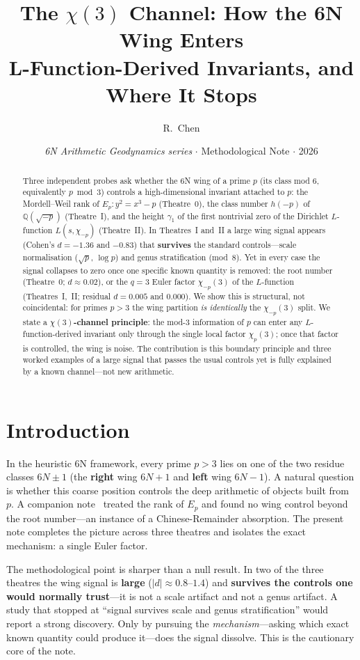 \documentclass[11pt]{article}
\title{\textbf{The $\chi(3)$ Channel: How the 6N Wing Enters\\
L-Function-Derived Invariants, and Where It Stops}}
\author{R.\ Chen}
\affil{GUT Geoservice Inc., Montr\'eal}
\date{\textit{6N Arithmetic Geodynamics series} $\cdot$ Methodological Note $\cdot$ 2026}
\newcommand{\chip}{\chi_{-p}}
\begin{document}
\maketitle

\begin{abstract}
\noindent
Three independent probes ask whether the 6N wing of a prime $p$ (its class mod $6$, equivalently
$p \bmod 3$) controls a high-dimensional invariant attached to $p$: the Mordell--Weil rank of
$E_p : y^2 = x^3 - p$ (Theatre~0), the class number $h(-p)$ of $\mathbb{Q}(\sqrt{-p})$ (Theatre~I),
and the height $\gamma_1$ of the first nontrivial zero of the Dirichlet $L$-function $L(s,\chip)$
(Theatre~II). In Theatres~I and~II a large wing signal appears (Cohen's $d = -1.36$ and $-0.83$)
that \textbf{survives} the standard controls---scale normalisation ($\sqrt{p}$, $\log p$) and genus
stratification (mod~8). Yet in every case the signal collapses to zero once one specific known
quantity is removed: the root number (Theatre~0; $d \approx 0.02$), or the $q=3$ Euler factor
$\chip(3)$ of the $L$-function (Theatres~I,~II; residual $d = 0.005$ and $0.000$). We show this is
structural, not coincidental: for primes $p > 3$ the wing partition \emph{is identically} the
$\chip(3)$ split. We state a \textbf{$\chi(3)$-channel principle}: the mod-3 information of $p$ can
enter any $L$-function-derived invariant only through the single local factor $\chi_p(3)$; once that
factor is controlled, the wing is noise. The contribution is this boundary principle and three worked
examples of a large signal that passes the usual controls yet is fully explained by a known
channel---not new arithmetic.
\end{abstract}

\section{Introduction}
In the heuristic 6N framework, every prime $p>3$ lies on one of the two residue classes $6N\pm1$
(the \textbf{right} wing $6N{+}1$ and \textbf{left} wing $6N{-}1$). A natural question is whether
this coarse position controls the deep arithmetic of objects built from $p$. A companion note~\cite{chen-crt}
treated the rank of $E_p$ and found no wing control beyond the root number---an instance of a
Chinese-Remainder absorption. The present note completes the picture across three theatres and
isolates the exact mechanism: a single Euler factor.

The methodological point is sharper than a null result. In two of the three theatres the wing signal
is \textbf{large} ($|d|\approx 0.8\text{--}1.4$) and \textbf{survives the controls one would normally
trust}---it is not a scale artifact and not a genus artifact. A study that stopped at ``signal
survives scale and genus stratification'' would report a strong discovery. Only by pursuing the
\emph{mechanism}---asking which exact known quantity could produce it---does the signal dissolve.
This is the cautionary core of the note.
\end{document}
